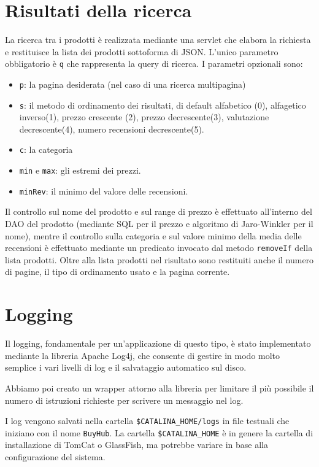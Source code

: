 \chapter{Risultati della ricerca}
La ricerca tra i prodotti è realizzata mediante una servlet che elabora la richiesta e restituisce la lista dei prodotti sottoforma di JSON. L'unico parametro obbligatorio è \texttt{q} che rappresenta la query di ricerca.
I parametri opzionali sono:
\begin{itemize}
  \item \texttt{p}: la pagina desiderata (nel caso di  una ricerca multipagina)
  \item \texttt{s}: il metodo di ordinamento dei risultati, di default alfabetico (0), alfagetico inverso(1), prezzo crescente (2), prezzo decrescente(3), valutazione decrescente(4),  numero recensioni decrescente(5).
  \item \texttt{c}: la categoria
  \item \texttt{min} e \texttt{max}: gli estremi dei prezzi.
  \item \texttt{minRev}: il minimo del valore delle recensioni.
\end{itemize}
Il controllo sul nome del prodotto e sul range di prezzo è effettuato all'interno del DAO del prodotto (mediante SQL per il prezzo e algoritmo di Jaro-Winkler per il nome), mentre il controllo sulla categoria e sul valore minimo della media delle recensioni è effettuato mediante un predicato invocato dal metodo \texttt{removeIf} della lista prodotti.
Oltre alla lista prodotti nel risultato sono restituiti anche il numero di pagine, il tipo di ordinamento usato e la pagina corrente.


\chapter{Logging}
Il logging, fondamentale per un'applicazione di questo tipo, è stato implementato mediante la libreria Apache Log4j, che consente di gestire in modo molto semplice i vari livelli di log e il salvataggio automatico sul disco.

Abbiamo poi creato un wrapper attorno alla libreria per limitare il più possibile il numero di istruzioni richieste per scrivere un messaggio nel log.

I log vengono salvati nella cartella \texttt{\$CATALINA\_HOME/logs} in file testuali che iniziano con il nome \texttt{BuyHub}.
La cartella \texttt{\$CATALINA\_HOME} è in genere la cartella di installazione di TomCat o GlassFish, ma potrebbe variare in base alla configurazione del sistema.

